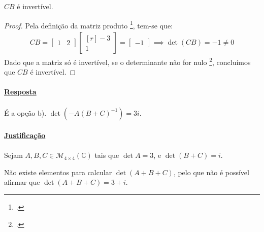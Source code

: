\clearpage
\begin{proposition}[opção 1.d]\label{prop:i-1-d}
	$CB$ é invertível.
\end{proposition}

\vspace{0.25cm}

\begin{proof}
	Pela definição da matriz produto
	\footcite[pág. 12, Definição 1.18: matriz produto]{Cabral2012},
	tem-se que:
	\begin{align*}
		CB =
		\begin{bmatrix*}
			1 & 2
		\end{bmatrix*}
		\begin{bmatrix*}[r]
			-3\\
			1
		\end{bmatrix*}
		=
		\begin{bmatrix}
			-1
		\end{bmatrix} \implies \det (CB) = -1 \neq 0
	\end{align*}
	Dado que a matriz só é invertível, se o determinante não for nulo
	\footcite[pág. 144, Proposição 3.23]{Cabral2012}, concluímos que
	$CB$ é invertível.
\end{proof}

\clearpage


\exercicio{}

\paragraph{\underline{Resposta}}

\paragraph{} É a opção b). $\det(-A(B + C)^{-1}) = 3i$.


\paragraph{\underline{Justificação}}


\paragraph{}Sejam $A, B, C \in \mathcal{M}_{4 \times 4}(\mathbb{C})$ tais que
$\det A = 3$, e $\det(B + C) = i$.

\vspace{0.25cm}

\begin{proposition}\label{prop:i-2-a}
	Não existe elementos para calcular $\det(A + B + C)$, pelo que não é
	possível afirmar que $\det(A + B + C) = 3 + i$.
\end{proposition}

